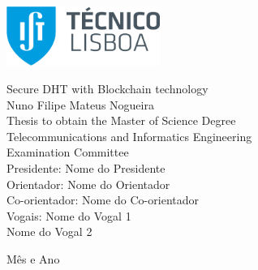 \thispagestyle {empty}

\includegraphics[width=5.0cm]{Logo.png}

\begin{center}
%

\vspace{0.8cm}
{\FontLb Secure DHT with Blockchain technology} \\
\vspace{2.6cm}
{\FontMb Nuno Filipe Mateus Nogueira} \\
\vspace{1.9cm}
{\FontLn Thesis to obtain the Master of Science Degree} \\
\vspace{0.3cm}
{\FontLb Telecommunications and Informatics Engineering} \\
\vspace{1.9cm}
{\FontMb Examination Committee} \\
\vspace{0.3cm}
{\FontSn %
Presidente:        Nome do Presidente \\
Orientador:        Nome do Orientador \\
Co-orientador:     Nome do Co-orientador \\
Vogais:            Nome do Vogal 1 \\
                   Nome do Vogal 2 \\
}
\vspace{1.5cm}

{\FontMb M\^{e}s e Ano} \\
%
\end{center}

\cleardoublepage

\restoregeometry
